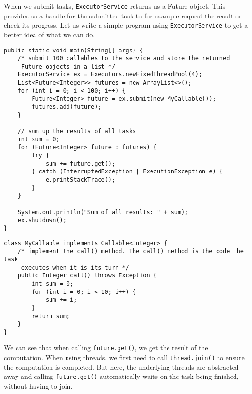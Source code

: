 \documentclass[main.tex]{subfiles}
\begin{document}
\noindent When we submit tasks, \texttt{ExecutorService} returns us a Future object. This provides us a handle for the submitted task to for example request the result or check its progress. Let us write a simple program using \texttt{ExecutorService} to get a better idea of what we can do.

\begin{verbatim}
public static void main(String[] args) {
    /* submit 100 callables to the service and store the returned
     Future objects in a list */
    ExecutorService ex = Executors.newFixedThreadPool(4);
    List<Future<Integer>> futures = new ArrayList<>();
    for (int i = 0; i < 100; i++) {
        Future<Integer> future = ex.submit(new MyCallable());
        futures.add(future);
    }

    // sum up the results of all tasks
    int sum = 0;
    for (Future<Integer> future : futures) {
        try {
            sum += future.get();
        } catch (InterruptedException | ExecutionException e) {
            e.printStackTrace();
        }
    }

    System.out.println("Sum of all results: " + sum);
    ex.shutdown();
}
\end{verbatim}

\newpage

\begin{verbatim}
class MyCallable implements Callable<Integer> {
    /* implement the call() method. The call() method is the code the task
     executes when it is its turn */
    public Integer call() throws Exception {
        int sum = 0;
        for (int i = 0; i < 10; i++) {
            sum += i;
        }
        return sum;
    }
}
\end{verbatim}

\noindent We can see that when calling \texttt{future.get()}, we get the result of the computation. When using threads, we first need to call \texttt{thread.join()} to ensure the computation is completed. But here, the underlying threads are abstracted away and calling \texttt{future.get()} automatically waits on the task being finished, without having to join.
\end{document}
